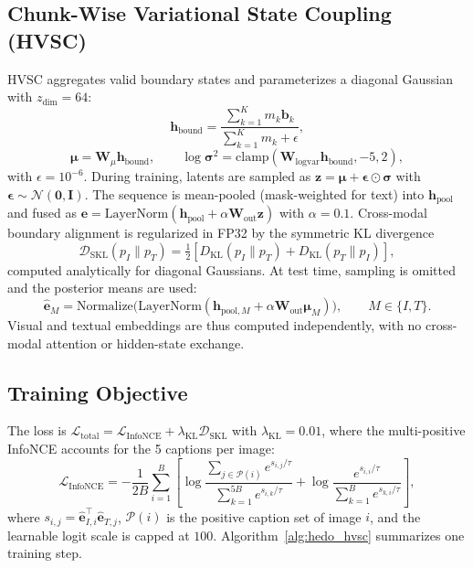 \documentclass[pdflatex,sn-mathphys-num]{sn-jnl}
\begin{document}
\subsection{Chunk-Wise Variational State Coupling (HVSC)}
HVSC aggregates valid boundary states and parameterizes a diagonal Gaussian with $z_{\text{dim}} = 64$:
\begin{equation}
\mathbf{h}_{\text{bound}} = \frac{\sum_{k=1}^K m_k \mathbf{b}_k}{\sum_{k=1}^K m_k + \epsilon}, \label{eq:hbound}
\end{equation}
\begin{equation}
\boldsymbol{\mu} = \mathbf{W}_\mu \mathbf{h}_{\text{bound}}, \qquad \log \boldsymbol{\sigma}^2 = \text{clamp}(\mathbf{W}_{\text{logvar}} \mathbf{h}_{\text{bound}}, -5, 2), \label{eq:latent}
\end{equation}
with $\epsilon = 10^{-6}$. During training, latents are sampled as $\mathbf{z} = \boldsymbol{\mu} + \boldsymbol{\epsilon} \odot \boldsymbol{\sigma}$ with $\boldsymbol{\epsilon} \sim \mathcal{N}(\mathbf{0}, \mathbf{I})$. The sequence is mean-pooled (mask-weighted for text) into $\mathbf{h}_{\text{pool}}$ and fused as $\mathbf{e} = \text{LayerNorm}(\mathbf{h}_{\text{pool}} + \alpha \mathbf{W}_{\text{out}} \mathbf{z})$ with $\alpha = 0.1$. Cross-modal boundary alignment is regularized in FP32 by the symmetric KL divergence
\begin{equation}
\mathcal{D}_{\text{SKL}}(p_I \parallel p_T) = \tfrac{1}{2} \left[ D_{\text{KL}}(p_I \parallel p_T) + D_{\text{KL}}(p_T \parallel p_I) \right], \label{eq:skl}
\end{equation}
computed analytically for diagonal Gaussians. At test time, sampling is omitted and the posterior means are used:
\begin{equation}
\hat{\mathbf{e}}_M = \text{Normalize}\big(\text{LayerNorm}(\mathbf{h}_{\text{pool}, M} + \alpha \mathbf{W}_{\text{out}} \boldsymbol{\mu}_M)\big), \qquad M \in \{I, T\}.
\end{equation}
Visual and textual embeddings are thus computed independently, with no cross-modal attention or hidden-state exchange.

\subsection{Training Objective}
The loss is $\mathcal{L}_{\text{total}} = \mathcal{L}_{\text{InfoNCE}} + \lambda_{\text{KL}} \mathcal{D}_{\text{SKL}}$ with $\lambda_{\text{KL}} = 0.01$, where the multi-positive InfoNCE accounts for the 5 captions per image:
\begin{equation}
\mathcal{L}_{\text{InfoNCE}} = -\frac{1}{2B} \sum_{i=1}^B \left[ \log \frac{\sum_{j \in \mathcal{P}(i)} e^{s_{i,j} / \tau}}{\sum_{k=1}^{5B} e^{s_{i,k} / \tau}} + \log \frac{e^{s_{i,i} / \tau}}{\sum_{k=1}^B e^{s_{k,i} / \tau}} \right], \label{eq:infonce}
\end{equation}
where $s_{i,j} = \hat{\mathbf{e}}_{I, i}^\top \hat{\mathbf{e}}_{T, j}$, $\mathcal{P}(i)$ is the positive caption set of image $i$, and the learnable logit scale is capped at $100$. Algorithm~\ref{alg:hedo_hvsc} summarizes one training step.
\end{document}
